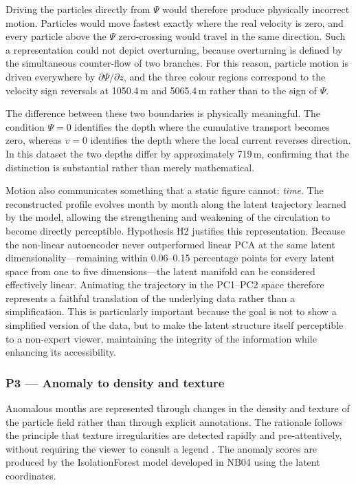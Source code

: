 Driving the particles directly from $\Psi$ would therefore produce physically incorrect motion. Particles would move fastest exactly where the real velocity is zero, and every particle above the $\Psi$ zero-crossing would travel in the same direction. Such a representation could not depict overturning, because overturning is defined by the simultaneous counter-flow of two branches. For this reason, particle motion is driven everywhere by $\partial\Psi/\partial z$, and the three colour regions correspond to the velocity sign reversals at 1050.4\,m and 5065.4\,m rather than to the sign of $\Psi$.

The difference between these two boundaries is physically meaningful. The condition $\Psi=0$ identifies the depth where the cumulative transport becomes zero, whereas $v=0$ identifies the depth where the local current reverses direction. In this dataset the two depths differ by approximately 719\,m, confirming that the distinction is substantial rather than merely mathematical.

Motion also communicates something that a static figure cannot: \emph{time}. The reconstructed profile evolves month by month along the latent trajectory learned by the model, allowing the strengthening and weakening of the circulation to become directly perceptible. Hypothesis H2 justifies this representation. Because the non-linear autoencoder never outperformed linear PCA at the same latent dimensionality—remaining within 0.06--0.15 percentage points for every latent space from one to five dimensions—the latent manifold can be considered effectively linear. Animating the trajectory in the PC1--PC2 space therefore represents a faithful translation of the underlying data rather than a simplification. This is particularly important because the goal is not to show a simplified version of the data, but to make the latent structure itself perceptible to a non-expert viewer, maintaining the integrity of the information while enhancing its accessibility.

\subsubsection*{P3 --- Anomaly to density and texture}

Anomalous months are represented through changes in the density and texture of the particle field rather than through explicit annotations. The rationale follows the principle that texture irregularities are detected rapidly and pre-attentively, without requiring the viewer to consult a legend \parencite{bertin1983,ware2021}. The anomaly scores are produced by the IsolationForest model developed in NB04 using the latent coordinates.

